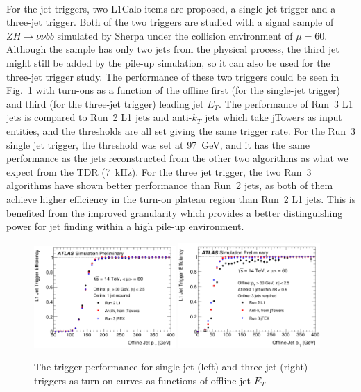 \\For the jet triggers, two L1Calo items are proposed, a single jet trigger and a three-jet trigger. Both of the two triggers are studied with a signal sample of $ZH\to\nu\nu bb$ simulated by Sherpa under the collision environment of $\mu=60$. Although the sample has only two jets from the physical process, the third jet might still be added by the pile-up simulation, so it can also be used for the three-jet trigger study. The performance of these two triggers could be seen in Fig.~\ref{Fig:jet_perf} with turn-ons as a function of the offline first (for the single-jet trigger) and third (for the three-jet trigger) leading jet $E_{T}$. The performance of Run~3 L1 jets is compared to Run~2 L1 jets and anti-$k_{T}$ jets which take jTowers as input entities, and the thresholds are all set giving the same trigger rate. For the Run~3 single jet trigger, the threshold was set at 97~GeV, and it has the same performance as the jets reconstructed from the other two algorithms as what we expect from the TDR (7~kHz). For the three jet trigger, the two Run~3 algorithms have shown better performance than Run~2 jets, as both of them achieve higher efficiency in the turn-on plateau region than Run~2 L1 jets. This is benefited from the improved granularity which provides a better distinguishing power for jet finding within a high pile-up environment.  
\begin{figure}[!h]                
	\includegraphics[width=0.48\textwidth]{Chapter6/perf_1jet.png}
	\includegraphics[width=0.48\textwidth]{Chapter6/perf_3jets.png}
	\begin{center}
		\caption{The trigger performance for single-jet (left) and three-jet (right) triggers as turn-on curves as functions of offline jet $E_{T}$}
		\label{Fig:jet_perf}            
	\end{center}
\end{figure}
